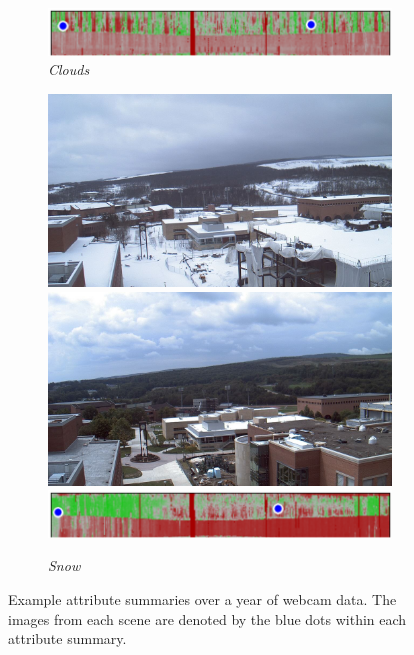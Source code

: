 \documentclass[10pt,twocolumn,letterpaper]{article}
\begin{document}
\begin{figure}
\begin{subfigure}[b]{\columnwidth}
		\includegraphics[width=\columnwidth]{figs/cam_summary/00000623_clouds.pdf}
    \caption{\emph{Clouds}}
    \label{fig:clouds}
	\end{subfigure}	
  \begin{subfigure}[b]{\columnwidth}
    \centering
		\includegraphics[width=0.49\columnwidth]{figs/cam_summary/260_01011844.jpg}
		\includegraphics[width=0.49\columnwidth]{figs/cam_summary/260_09011714.jpg}
    \includegraphics[width=\columnwidth]{figs/cam_summary/00000260_snow.pdf}
    \caption{\emph{Snow}}
    \label{fig:snow}
	\end{subfigure}	
	\caption{Example attribute summaries over a year of webcam data.  The images
           from each scene are denoted by the blue dots within each 
           attribute summary.}
	\label{fig:webcam_summary}
\end{figure}

\end{document}
